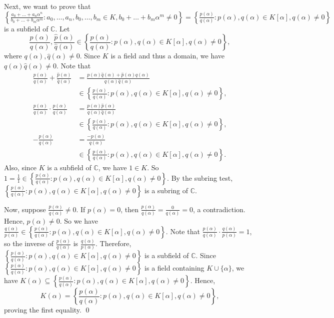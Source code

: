 \documentclass[a4paper, 12pt]{article}
\newcommand{\lt}{\left}
\newcommand{\rt}{\right}
\newcommand{\C}{\mathbb{C}}
\newcommand{\epf}{\hfill \qed}
\begin{document}
Next, we want to prove that $\lt\{ \frac{a_0+\ldots+a_n\alpha^n}{b_0+\ldots+b_m\alpha^m} : a_0,\ldots,a_n,b_0,\ldots,b_m \in K, b_0+\ldots+b_m\alpha^m \neq 0 \rt\} = \lt\{ \frac{p(\alpha)}{q(\alpha)} : p(\alpha),q(\alpha) \in K[\alpha], q(\alpha) \neq 0 \rt\}$ is a subfield of $\C$. Let \[\frac{p(\alpha)}{q(\alpha)}, \frac{\hat{p}(\alpha)}{\hat{q}(\alpha)} \in \lt\{ \frac{p(\alpha)}{q(\alpha)} : p(\alpha),q(\alpha) \in K[\alpha], q(\alpha) \neq 0 \rt\},\] where $q(\alpha), \hat{q}(\alpha) \neq 0$. Since $K$ is a field and thus a domain, we have $q(\alpha)\hat{q}(\alpha) \neq 0$. Note that
\begin{align*}
    \frac{p(\alpha)}{q(\alpha)} + \frac{\hat{p}(\alpha)}{\hat{q}(\alpha)} &= \frac{p(\alpha)\hat{q}(\alpha) + \hat{p}(\alpha)q(\alpha)}{q(\alpha)\hat{q}(\alpha)} \\
    &\in \lt\{ \frac{p(\alpha)}{q(\alpha)} : p(\alpha),q(\alpha) \in K[\alpha], q(\alpha) \neq 0 \rt\}, \\
    \frac{p(\alpha)}{q(\alpha)} \cdot \frac{\hat{p}(\alpha)}{\hat{q}(\alpha)} &= \frac{p(\alpha)\hat{p}(\alpha)}{q(\alpha)\hat{q}(\alpha)} \\
    &\in \lt\{ \frac{p(\alpha)}{q(\alpha)} : p(\alpha),q(\alpha) \in K[\alpha], q(\alpha) \neq 0 \rt\}, \\
    -\frac{p(\alpha)}{q(\alpha)} &= \frac{-p(\alpha)}{q(\alpha)} \\
    &\in \lt\{ \frac{p(\alpha)}{q(\alpha)} : p(\alpha),q(\alpha) \in K[\alpha], q(\alpha) \neq 0 \rt\}.
\end{align*}
Also, since $K$ is a subfield of $\C$, we have $1 \in K$. So $1 = \frac{1}{1} \in \lt\{ \frac{p(\alpha)}{q(\alpha)} : p(\alpha),q(\alpha) \in K[\alpha], q(\alpha) \neq 0 \rt\}$. By the subring test, $\lt\{ \frac{p(\alpha)}{q(\alpha)} : p(\alpha),q(\alpha) \in K[\alpha], q(\alpha) \neq 0 \rt\}$ is a subring of $\C$.

Now, suppose $\frac{p(\alpha)}{q(\alpha)} \neq 0$. If $p(\alpha) = 0$, then $\frac{p(\alpha)}{q(\alpha)} = \frac{0}{q(\alpha)} = 0$, a contradiction. Hence, $p(\alpha) \neq 0$. So we have $\frac{q(\alpha)}{p(\alpha)} \in \lt\{ \frac{p(\alpha)}{q(\alpha)} : p(\alpha),q(\alpha) \in K[\alpha], q(\alpha) \neq 0 \rt\}$. Note that $\frac{p(\alpha)}{q(\alpha)} \cdot \frac{q(\alpha)}{p(\alpha)} = 1$, so the inverse of $\frac{p(\alpha)}{q(\alpha)}$ is $\frac{q(\alpha)}{p(\alpha)}$. Therefore, $\lt\{ \frac{p(\alpha)}{q(\alpha)} : p(\alpha),q(\alpha) \in K[\alpha], q(\alpha) \neq 0 \rt\}$ is a subfield of $\C$. Since $\lt\{ \frac{p(\alpha)}{q(\alpha)} : p(\alpha),q(\alpha) \in K[\alpha], q(\alpha) \neq 0 \rt\}$ is a field containing $K \cup \{\alpha\}$, we have $K(\alpha) \subseteq \lt\{ \frac{p(\alpha)}{q(\alpha)} : p(\alpha),q(\alpha) \in K[\alpha], q(\alpha) \neq 0 \rt\}$. Hence, \[K(\alpha) = \lt\{ \frac{p(\alpha)}{q(\alpha)} : p(\alpha),q(\alpha) \in K[\alpha], q(\alpha) \neq 0 \rt\},\] proving the first equality. \epf
\end{document}
